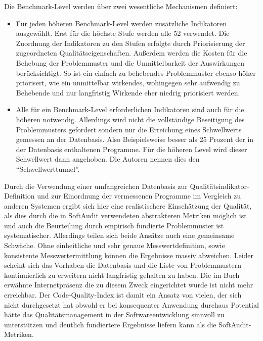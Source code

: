 \documentclass[gb,ngerman]{stthesis}
\begin{document}
			Die Benchmark-Level werden über zwei wesentliche Mechanismen definiert: 
			\begin{itemize}
				\item Für jeden höheren Benchmark-Level werden zusätzliche Indikatoren ausgewählt. Erst für die höchste Stufe werden alle 52 verwendet. Die Zuordnung der Indikatoren zu den Stufen erfolgte durch Priorisierung der zugeordneten Qualitätseigenschaften. Außerdem werden die Kosten für die Behebung der Problemmuster und die Unmittelbarkeit der Auswirkungen berücksichtigt. So ist ein einfach zu behebendes Problemmuster ebenso höher priorisert, wie ein unmittelbar wirkendes, wohingegen sehr aufwendig zu Behebende und nur langfristig Wirkende eher niedrig priorisiert werden.
				\item Alle für ein Benchmark-Level erforderlichen Indikatoren sind auch für die höheren notwendig. Allerdings wird nicht die vollständige Beseitigung des Problemmusters gefordert sondern nur die Erreichung eines Schwellwerts gemessen an der Datenbasis. Also Beispielsweise besser als 25 Prozent der in der Datenbasis enthaltenen Programme. Für die höheren Level wird dieser Schwellwert dann angehoben. Die Autoren nennen dies den "`Schwellwerttunnel"'.
			\end{itemize}
			Durch die Verwendung einer umfangreichen Datenbasis zur Qualitätsindikator-Definition und zur Einordnung der vermessenen Programme im Vergleich zu anderen Systemen ergibt sich hier eine realistischere Einschätzung der Qualität, als dies durch die in SoftAudit verwendeten abstrakteren Metriken möglich ist und auch die Beurteilung durch empirisch fundierte Problemmuster ist systematischer. Allerdings teilen sich beide Ansätze auch eine gemeinsame Schwäche. Ohne einheitliche und sehr genaue Messwertdefinition, sowie konsistente Messwertermittlung können die Ergebnisse massiv abweichen. \newline
			Leider scheint sich das Vorhaben die Datenbasis und die Liste von Problemmustern kontinuierlich zu erweitern nicht langfristig gehalten zu haben. Die im Buch erwähnte Internetpräsenz die zu diesem Zweck eingerichtet wurde ist nicht mehr erreichbar. Der Code-Quality-Index ist damit ein Ansatz von vielen, der sich nicht durchgesetzt hat obwohl er bei konsequenter Anwendung durchaus Potential hätte das Qualitätsmanagement in der Softwareentwicklung sinnvoll zu unterstützen und deutlich fundiertere Ergebnisse liefern kann als die SoftAudit-Metriken. 
\end{document}
